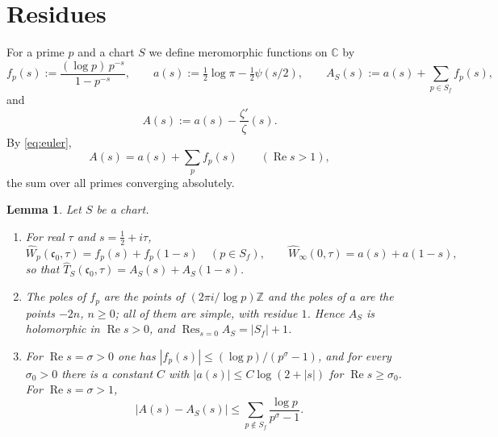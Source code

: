 \documentclass[11pt]{amsart}
\newtheorem{lemma}[theorem]{Lemma}
\theoremstyle{remark}
\numberwithin{equation}{section}
\newcommand{\C}{\mathbb C}
\newcommand{\Z}{\mathbb Z}
\newcommand{\Rel}{\operatorname{Re}}
\newcommand{\Res}{\operatorname*{Res}}
\newcommand{\cz}{\mathfrak c_0}
\begin{document}
\section{Residues}
\label{sec:polar}

For a prime $p$ and a chart $S$ we define meromorphic functions on $\C$ by
\begin{equation}
\label{eq:AS}
  f_p(s):=\frac{(\log p)\,p^{-s}}{1-p^{-s}},\qquad
  a(s):=\tfrac12\log\pi-\tfrac12\psi(s/2),\qquad
  A_S(s):=a(s)+\sum_{p\in S_f}f_p(s),
\end{equation}
and
\begin{equation}
\label{eq:A}
  A(s):=a(s)-\frac{\zeta'}{\zeta}(s).
\end{equation}
By \eqref{eq:euler},
\begin{equation}
\label{eq:Asum}
  A(s)=a(s)+\sum_pf_p(s)\qquad(\Rel s>1),
\end{equation}
the sum over all primes converging absolutely.

\begin{lemma}
\label{lem:localsymbols}
Let $S$ be a chart.
\begin{enumerate}
\item[(i)] For real $\tau$ and $s=\tfrac12+i\tau$,
\[
  \widehat W_p(\cz,\tau)=f_p(s)+f_p(1-s)\quad(p\in S_f),\qquad
  \widehat W_\infty(0,\tau)=a(s)+a(1-s),
\]
so that $\widehat T_S(\cz,\tau)=A_S(s)+A_S(1-s)$.
\item[(ii)] The poles of $f_p$ are the points of $(2\pi i/\log p)\Z$ and the
poles of $a$ are the points $-2n$, $n\ge0$; all of them are simple, with
residue $1$.  Hence $A_S$ is holomorphic in $\Rel s>0$, and
$\Res_{s=0}A_S=|S_f|+1$.
\item[(iii)] For $\Rel s=\sigma>0$ one has $|f_p(s)|\le(\log p)/(p^\sigma-1)$,
and for every $\sigma_0>0$ there is a constant $C$ with
$|a(s)|\le C\log(2+|s|)$ for $\Rel s\ge\sigma_0$.  For $\Rel s=\sigma>1$,
\begin{equation}
\label{eq:AminusAS}
  |A(s)-A_S(s)|\le\sum_{p\notin S_f}\frac{\log p}{p^\sigma-1}.
\end{equation}
\end{enumerate}
\end{lemma}
\end{document}

